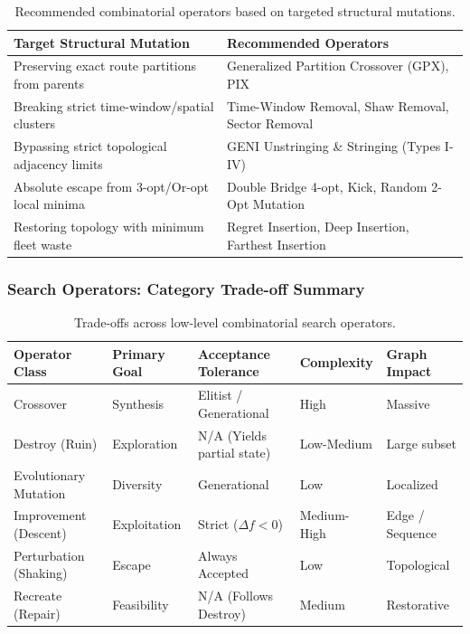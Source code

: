 \documentclass{article}
\begin{document}
\begin{table}[H]
    \centering
    \caption{Recommended combinatorial operators based on targeted structural mutations.}
    \begin{tabularx}{\textwidth}{@{} l X @{}}
        \toprule
        \textbf{Target Structural Mutation} & \textbf{Recommended Operators} \\
        \midrule
        Preserving exact route partitions from parents & Generalized Partition Crossover (GPX), PIX \\
        Breaking strict time-window/spatial clusters & Time-Window Removal, Shaw Removal, Sector Removal \\
        Bypassing strict topological adjacency limits & GENI Unstringing \& Stringing (Types I-IV) \\
        Absolute escape from 3-opt/Or-opt local minima & Double Bridge 4-opt, Kick, Random 2-Opt Mutation \\
        Restoring topology with minimum fleet waste & Regret Insertion, Deep Insertion, Farthest Insertion \\
        \bottomrule
    \end{tabularx}
\end{table}

\subsubsection*{Search Operators: Category Trade-off Summary}

\begin{table}[H]
    \centering
    \caption{Trade-offs across low-level combinatorial search operators.}
    \begin{tabularx}{\textwidth}{@{} X l l l X @{}}
        \toprule
        \textbf{Operator Class} & \textbf{Primary Goal} & \textbf{Acceptance Tolerance} & \textbf{Complexity} & \textbf{Graph Impact} \\
        \midrule
        Crossover & Synthesis & Elitist / Generational & High & Massive \\
        Destroy (Ruin) & Exploration & N/A (Yields partial state) & Low-Medium & Large subset \\
        Evolutionary Mutation & Diversity & Generational & Low & Localized \\
        Improvement (Descent) & Exploitation & Strict ($\Delta f < 0$) & Medium-High & Edge / Sequence \\
        Perturbation (Shaking) & Escape & Always Accepted & Low & Topological \\
        Recreate (Repair) & Feasibility & N/A (Follows Destroy) & Medium & Restorative \\
        \bottomrule
    \end{tabularx}
\end{table}
\end{document}
